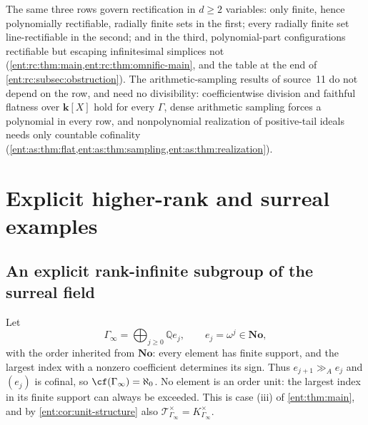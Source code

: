 \documentclass[11pt]{article}
\theoremstyle{plain}
\theoremstyle{plain}
\theoremstyle{plain}
\theoremstyle{definition}
\theoremstyle{definition}
\theoremstyle{definition}
\theoremstyle{definition}
\theoremstyle{remark}
\newcommand{\Q}{\mathbb Q}\newcommand{\Z}{\mathbb Z}\newcommand{\N}{\mathbb N}
\newcommand{\No}{\mathbf{No}}
\newcommand{\ggA}{\mathrel{\gg_{\!A}}}
\newcommand{\kk}{\mathbf k}\newcommand{\PP}{\mathbb P}
\begin{document}
The same three rows govern rectification in $d\ge2$ variables: only finite,
hence polynomially rectifiable, radially finite sets in the first; every
radially finite set line-rectifiable in the second; and in the third,
polynomial-part configurations rectifiable but escaping infinitesimal
simplices not (\cref{ent:rc:thm:main,ent:rc:thm:omnific-main}, and the table
at the end of \cref{ent:rc:subsec:obstruction}).
The arithmetic-sampling results of source~11 do not depend on the row, and
need no divisibility: coefficientwise division and faithful flatness over
$\kk[X]$ hold for every $\Gamma$, dense arithmetic sampling forces a polynomial
in every row, and nonpolynomial realization of positive-tail ideals needs only
countable cofinality
(\cref{ent:as:thm:flat,ent:as:thm:sampling,ent:as:thm:realization}).

\section{Explicit higher-rank and surreal examples}
\label{ent:sec:examples}

\subsection{An explicit rank-infinite subgroup of the surreal field}
\label{ent:subsec:gamma-infinity}
Let
\begin{equation}\label{ent:eq:concrete-group}
 \Gamma_\infty=\bigoplus_{j\ge0}\Q e_j,
 \qquad e_j=\omega^j\in\No,
\end{equation}
with the order inherited from $\No$: every element has finite support, and
the largest index with a nonzero coefficient determines its sign. Thus
$e_{j+1}\ggA e_j$ and $(e_j)$ is cofinal, so $\cf(\Gamma_\infty)=\aleph_0$.
No element is an order unit: the largest index in its finite support can
always be exceeded. This is case (iii) of \cref{ent:thm:main}, and by
\cref{ent:cor:unit-structure} also
$\mathcal T_{\Gamma_\infty}^\times=K_{\Gamma_\infty}^\times$.
\end{document}
